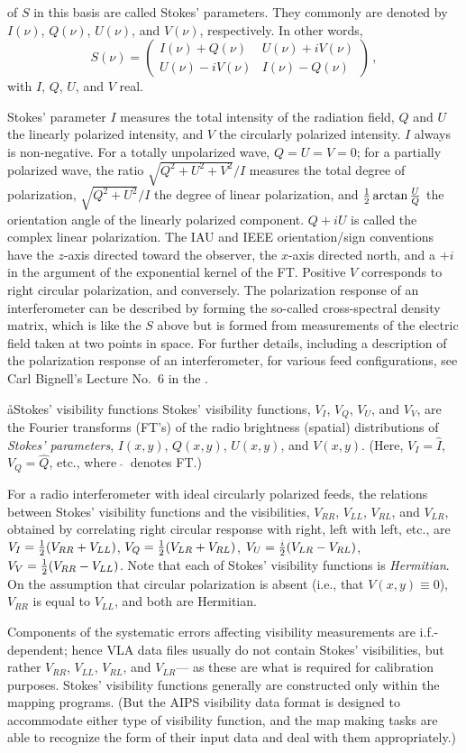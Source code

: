 of $S$ in this basis are called Stokes' parameters.
They commonly are denoted by $I(\nu)$, $Q(\nu)$, $U(\nu)$, and $V(\nu)$,
respectively.
In other words,
$$S(\nu)=\left(\begin{array}{cc} I(\nu)+Q(\nu) & U(\nu)+iV(\nu)\\
                  U(\nu)-iV(\nu)& I(\nu)-Q(\nu) \end{array}\right)\,,$$
with $I$, $Q$, $U$, and $V$ real.
\par
Stokes' parameter $I$ measures the total intensity of the radiation
field, $Q$ and $U$ the linearly polarized intensity, and $V$ the
circularly polarized intensity.
$I$ always is non-negative.
For a totally unpolarized wave, $Q=U=V=0$; for a partially polarized
wave, the ratio $\sqrt{Q^2+U^2+V^2}/I$ measures the total
degree of polarization,
$\sqrt{Q^2+U^2}/I$ the degree of linear polarization,
and ${1\over2}\arctan{U\over Q}$ the orientation angle
of the linearly polarized component.
$Q+iU$ is called the complex linear polarization.
The IAU and IEEE orientation/sign conventions have the $z$-axis
directed toward the observer, the $x$-axis directed north,
and a $+i$ in the argument of the exponential kernel of the FT.
Positive $V$ corresponds to right circular polarization, and conversely.
The polarization response of an interferometer can be described
by forming the so-called cross-spectral density matrix, which is like
the $S$ above but is formed from measurements of the electric field
taken at two points in space.
For further details, including a description
of the polarization response of an interferometer,
for various feed configurations, see Carl Bignell's
Lecture No.~6 in the \wsp.

\aa{Stokes' visibility functions}
Stokes' visibility functions, $V_I$, $V_Q$, $V_U$, and $V_V$,
are the Fourier transforms (FT's) of the radio brightness (spatial)
distributions of {\it Stokes' parameters},
$I(x,y)$, $Q(x,y)$, $U(x,y)$, and $V(x,y)$.
(Here, $V_I=\hat I$, $V_Q=\hat Q$, etc., where $\ \hat {}\ $ denotes FT.)
\par
For a radio interferometer with ideal circularly polarized feeds,
the relations between Stokes' visibility functions
and the visibilities, $V_{RR}$, $V_{LL}$, $V_{RL}$, and $V_{LR}$,
obtained by correlating right circular response with right,
left with left, etc., are
$V_I={1\over2}(V_{RR}+V_{LL})$, $V_Q={1\over2}(V_{LR}+V_{RL})$,
$V_U={i\over2}(V_{LR}-V_{RL})$, $V_V={1\over2}(V_{RR}-V_{LL})$.
Note that each of Stokes' visibility functions is {\it Hermitian}.
On the assumption that circular polarization is absent
(i.e., that $V(x,y)\equiv0$), $V_{RR}$ is equal to $V_{LL}$,
and both are Hermitian.
\par
Components of the systematic errors affecting visibility
measurements are i.f.-dependent;
hence VLA \uv data files usually do not contain Stokes'
visibilities, but rather $V_{RR}$, $V_{LL}$, $V_{RL}$, and $V_{LR}$---%
as these are what is required for calibration purposes.
Stokes' visibility functions generally are constructed only within
the mapping programs.
(But the AIPS visibility data format is designed to accommodate
either type of visibility function, and the map making tasks are
able to recognize the form of their input data and deal with them
appropriately.)

